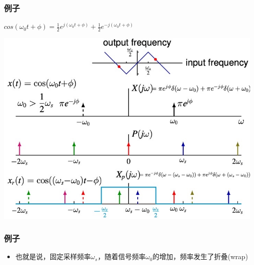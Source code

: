 \documentclass[CJKutf8,dvipsnames,table]{beamer}
\begin{document}
\begin{CJK*}{UTF8}{song}
\begin{frame}
  \end{frame}   
  
  \begin{frame}
    \frametitle{例子}
	$cos(\omega_0 t + \phi) = \frac{1}{2}e^{j(\omega_0 t+ \phi)}+\frac{1}{2}e^{-j(\omega_0 t+ \phi)}	$

    \begin{center}
    \includegraphics[scale=.42]{aliasing-example-4}
    \end{center}

  \end{frame}       
    	
  \begin{frame}
    \frametitle{例子}

	\begin{itemize}
	\item 也就是说，固定采样频率$\omega_s$，随着信号频率$\omega_0$的增加，频率发生了折叠(wrap)
	\end{itemize}

  \end{frame}   
	

\end{CJK*}
\end{document}

